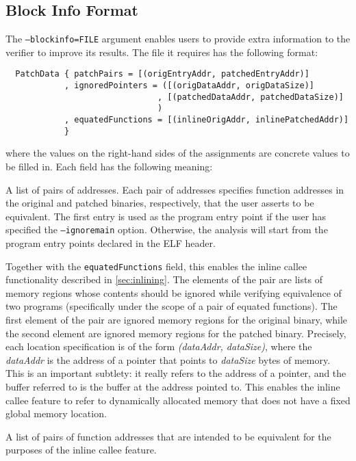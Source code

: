 \subsection{Block Info Format}\label{sec:options:block-info}

The \texttt{--blockinfo=FILE} argument enables users to provide extra information to the verifier to improve its results.  The file it requires has the following format:

\begin{lstlisting}
  PatchData { patchPairs = [(origEntryAddr, patchedEntryAddr)]
            , ignoredPointers = ([(origDataAddr, origDataSize)]
                               , [(patchedDataAddr, patchedDataSize)]
                               )
            , equatedFunctions = [(inlineOrigAddr, inlinePatchedAddr)]
            }
\end{lstlisting}

where the values on the right-hand sides of the assignments are concrete values to be filled in.  Each field has the following meaning:

\begin{description}[style=nextline]
\item[\texttt{patchPairs}] A list of pairs of addresses. Each pair of addresses specifies function addresses in the original and patched binaries, respectively, that the user asserts to be equivalent. The first entry is used as the program entry point if the user has specified the \texttt{--ignoremain} option.  Otherwise, the analysis will start from the program entry points declared in the ELF header.
\item[\texttt{ignoredPointers}] Together with the \texttt{equatedFunctions} field, this enables the inline callee functionality described in \cref{sec:inlining}. The elements of the pair are lists of memory regions whose contents should be ignored while verifying equivalence of two programs (specifically under the scope of a pair of equated functions). The first element of the pair are ignored memory regions for the original binary, while the second element are ignored memory regions for the patched binary. Precisely, each location specification is of the form \emph{(dataAddr, dataSize)}, where the \emph{dataAddr} is the address of a pointer that points to \emph{dataSize} bytes of memory. This is an important subtlety: it really refers to the address of a pointer, and the buffer referred to is the buffer at the address pointed to. This enables the inline callee feature to refer to dynamically allocated memory that does not have a fixed global memory location.
\item[\texttt{equatedFunctions}] A list of pairs of function addresses that are intended to be equivalent for the purposes of the inline callee feature.
\end{description}

